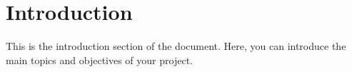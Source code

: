 \section{Introduction}

This is the introduction section of the document. Here, you can introduce the main topics and objectives of your project.
